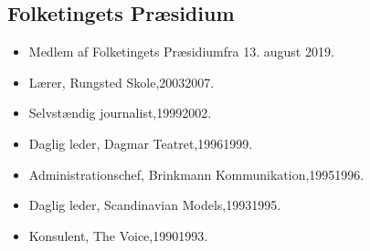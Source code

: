 \documentclass[11pt, a4paper]{awesome-cv}
\begin{document}
\begin{cvletter}
\subsection*{Folketingets Præsidium}
\begin{itemize}
\item Medlem af Folketingets Præsidiumfra 13. august 2019.
\end{itemize}
\begin{itemize}
\item Lærer, Rungsted Skole,20032007.
\item Selvstændig journalist,19992002.
\item Daglig leder, Dagmar Teatret,19961999.
\item Administrationschef, Brinkmann Kommunikation,19951996.
\item Daglig leder, Scandinavian Models,19931995.
\item Konsulent, The Voice,19901993.
\end{itemize}
\end{cvletter}
\end{document}

